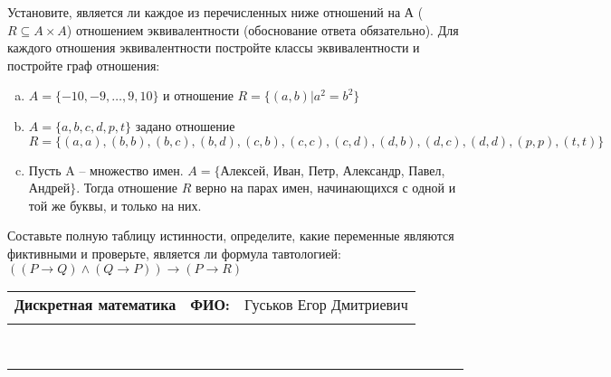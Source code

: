 \documentclass[10pt]{exam}
\newcommand{\class}{Дискретная математика}
\newcommand{\examdate}{}
\begin{document}
\begin{questions}
\question
Установите, является ли каждое из перечисленных ниже отношений на А ($R \subseteq A \times A$) отношением эквивалентности (обоснование ответа обязательно). Для каждого отношения эквивалентности постройте классы 
эквивалентности и постройте граф отношения:
\begin{enumerate} [a)]\setcounter{enumi}{0}
\item $A = \{-10, -9, … , 9, 10\}$ и отношение $R = \{(a,b)|a^{2} = b^{2}\}$
\item $A = \{a, b, c, d, p, t\}$ задано отношение $R = \{(a, a), (b, b), (b, c), (b, d), (c, b), (c, c), (c, d), (d, b), (d, c), (d, d), (p,p), (t,t)\}$
\item Пусть A – множество имен. $A = \{ $Алексей, Иван, Петр, Александр, Павел, Андрей$ \}$. Тогда отношение $R$ верно на парах имен, начинающихся с одной и той же буквы, и только на них.
\end{enumerate}\question Составьте полную таблицу истинности, определите, какие переменные являются фиктивными и проверьте, является ли формула тавтологией:
$(( P \rightarrow Q) \land (Q \rightarrow P)) \rightarrow (P \rightarrow R)$

\end{questions}
\newpage
\begin{flushright}
\begin{tabular}{p{2.8in} r l}
\textbf{\class} & \textbf{ФИО:} &Гуськов Егор Дмитриевич
\\

\textbf{\examdate} &&\\
\end{tabular}\\
\end{flushright}
\rule[1ex]{\textwidth}{.1pt}
\end{document}
